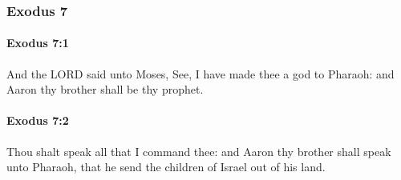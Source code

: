 	\subsubsection{Exodus 7} %
		\label{EXODUS-7}

		\paragraph{Exodus 7:1} %
			\label{EXODUS-7-1}

			And the LORD said unto Moses, See, I have made thee a god to Pharaoh: and Aaron thy brother shall be thy prophet.


		\paragraph{Exodus 7:2} %
			\label{EXODUS-7-2}

			Thou shalt speak all that I command thee: and Aaron thy brother shall speak unto Pharaoh, that he send the children of Israel out of his land.

